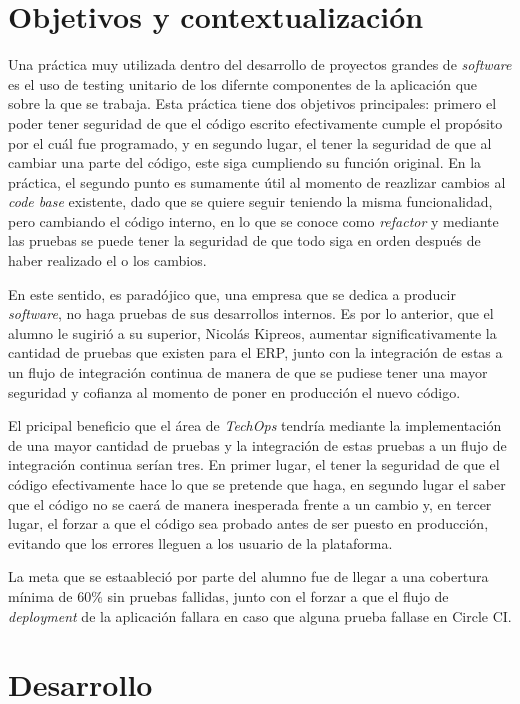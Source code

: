 \section{Objetivos y contextualización}

  Una práctica muy utilizada dentro del desarrollo de proyectos grandes de \textit{software} es el uso de testing unitario de los difernte componentes de la aplicación que sobre la que se trabaja. Esta práctica tiene dos objetivos principales: primero el poder tener seguridad de que el código escrito efectivamente cumple el propósito por el cuál fue programado, y en segundo lugar, el tener la seguridad de que al cambiar una parte del código, este siga cumpliendo su función original. En la práctica, el segundo punto es sumamente útil al momento de reazlizar cambios al \textit{code base} existente, dado que se quiere seguir teniendo la misma funcionalidad, pero cambiando el código interno, en lo que se conoce como \textit{refactor} y mediante las pruebas se puede tener la seguridad de que todo siga en orden después de haber realizado el o los cambios. 
  
  En este sentido, es paradójico que, una empresa que se dedica a producir \textit{software}, no haga pruebas de sus desarrollos internos. Es por lo anterior, que el alumno le sugirió a su superior, Nicolás Kipreos, aumentar significativamente la cantidad de pruebas que existen para el ERP, junto con la integración de estas a un flujo de integración continua de manera de que se pudiese tener una mayor seguridad y cofianza al momento de poner en producción el nuevo código.

  El pricipal beneficio que el área de \textit{TechOps} tendría mediante la implementación de una mayor cantidad de pruebas y la integración de estas pruebas a un flujo de integración continua serían tres. En primer lugar, el tener la seguridad de que el código efectivamente hace lo que se pretende que haga, en segundo lugar el saber que el código no se caerá de manera inesperada frente a un cambio y, en tercer lugar, el forzar a que el código sea probado antes de ser puesto en producción, evitando que los errores lleguen a los usuario de la plataforma.

  La meta que se estaableció por parte del alumno fue de llegar a una cobertura mínima de 60\% sin pruebas fallidas, junto con el forzar a que el flujo de \textit{deployment} de la aplicación fallara en caso que alguna prueba fallase en Circle CI.

\section{Desarrollo}

